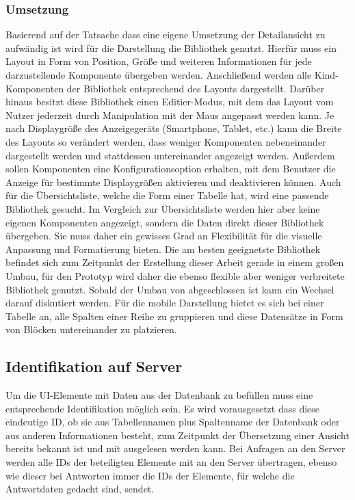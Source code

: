 \subsubsection{Umsetzung}\label{subsec:layout}
Basierend auf der Tatsache dass eine eigene Umsetzung der Detailansicht zu aufwändig ist wird für die Darstellung die Bibliothek  genutzt. Hierfür muss ein Layout in Form von Position, Größe und weiteren Informationen für jede darzustellende Komponente übergeben werden. Anschließend werden alle Kind-Komponenten der Bibliothek entsprechend des Layouts dargestellt. Darüber hinaus besitzt diese Bibliothek einen Editier-Modus, mit dem das Layout vom Nutzer jederzeit durch Manipulation mit der Maus angepasst werden kann. Je nach Displaygröße des Anzeigegeräts (Smartphone, Tablet, etc.) kann die Breite des Layouts so verändert werden, dass weniger Komponenten nebeneinander dargestellt werden und stattdessen untereinander angezeigt werden. Außerdem sollen Komponenten eine Konfigurationsoption erhalten, mit dem Benutzer die Anzeige für bestimmte Displaygrößen aktivieren und deaktivieren können.
Auch für die Übersichtsliste, welche die Form einer Tabelle hat, wird eine passende Bibliothek gesucht. Im Vergleich zur Übersichtsliste werden hier aber keine eigenen Komponenten angezeigt, sondern die Daten direkt dieser Bibliothek übergeben. Sie muss daher ein gewisses Grad an Flexibilität für die visuelle Anpassung und Formatierung bieten. Die am besten geeignetste Bibliothek  befindet sich zum Zeitpunkt der Erstellung dieser Arbeit gerade in einem großen Umbau, für den Prototyp wird daher die ebenso flexible aber weniger verbreitete Bibliothek  genutzt. Sobald der Umbau von  abgeschlossen ist kann ein Wechsel darauf diskutiert werden. Für die mobile Darstellung bietet es sich bei einer Tabelle an, alle Spalten einer Reihe zu gruppieren und diese Datensätze in Form von Blöcken untereinander zu platzieren.

\subsection{Identifikation auf Server}
Um die UI-Elemente mit Daten aus der Datenbank zu befüllen muss eine entsprechende Identifikation möglich sein. Es wird vorausgesetzt dass diese eindeutige ID, ob sie aus Tabellennamen plus Spaltenname der Datenbank oder aus anderen Informationen besteht, zum Zeitpunkt der Übersetzung einer Ansicht bereits bekannt ist und mit ausgelesen werden kann. Bei Anfragen an den Server werden alle IDs der beteiligten Elemente mit an den Server übertragen, ebenso wie dieser bei Antworten immer die IDs der Elemente, für welche die Antwortdaten gedacht sind, sendet.

